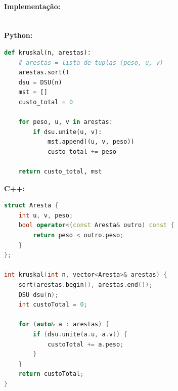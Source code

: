 \vspace{0.3cm}

\paragraph{Implementação: }\mbox{}\\
\textbf{Python: }
\begin{lstlisting}[language=Python]
def kruskal(n, arestas):
    # arestas = lista de tuplas (peso, u, v)
    arestas.sort()
    dsu = DSU(n)
    mst = []
    custo_total = 0
    
    for peso, u, v in arestas:
        if dsu.unite(u, v):
            mst.append((u, v, peso))
            custo_total += peso
            
    return custo_total, mst
\end{lstlisting}

\vspace{0.3cm}
\textbf{C++:}
\begin{lstlisting}[language=C++]
struct Aresta {
    int u, v, peso;
    bool operator<(const Aresta& outro) const {
        return peso < outro.peso;
    }
};

int kruskal(int n, vector<Aresta>& arestas) {
    sort(arestas.begin(), arestas.end());
    DSU dsu(n);
    int custoTotal = 0;
    
    for (auto& a : arestas) {
        if (dsu.unite(a.u, a.v)) {
            custoTotal += a.peso;
        }
    }
    return custoTotal;
}
\end{lstlisting}
\newpage